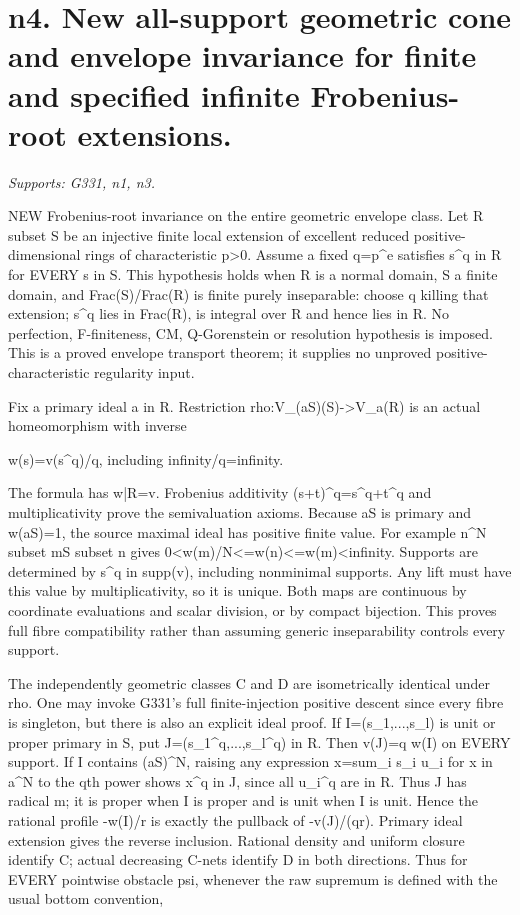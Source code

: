\section{n4. New all-support geometric cone and envelope invariance for finite and specified infinite Frobenius-root extensions.}
\textit{Supports: G331, n1, n3.}

NEW Frobenius-root invariance on the entire geometric envelope class. Let R subset S be an injective finite local extension of excellent reduced positive-dimensional rings of characteristic p\textgreater{}0. Assume a fixed q=p\textasciicircum{}e satisfies s\textasciicircum{}q in R for EVERY s in S. This hypothesis holds when R is a normal domain, S a finite domain, and Frac(S)/Frac(R) is finite purely inseparable: choose q killing that extension; s\textasciicircum{}q lies in Frac(R), is integral over R and hence lies in R. No perfection, F-finiteness, CM, Q-Gorenstein or resolution hypothesis is imposed. This is a proved envelope transport theorem; it supplies no unproved positive-characteristic regularity input.

Fix a primary ideal a in R. Restriction rho:V\_(aS)(S)-\textgreater{}V\_a(R) is an actual homeomorphism with inverse

 w(s)=v(s\textasciicircum{}q)/q, including infinity/q=infinity.

The formula has w|R=v. Frobenius additivity (s+t)\textasciicircum{}q=s\textasciicircum{}q+t\textasciicircum{}q and multiplicativity prove the semivaluation axioms. Because aS is primary and w(aS)=1, the source maximal ideal has positive finite value. For example n\textasciicircum{}N subset mS subset n gives 0\textless{}w(m)/N\textless{}=w(n)\textless{}=w(m)\textless{}infinity. Supports are determined by s\textasciicircum{}q in supp(v), including nonminimal supports. Any lift must have this value by multiplicativity, so it is unique. Both maps are continuous by coordinate evaluations and scalar division, or by compact bijection. This proves full fibre compatibility rather than assuming generic inseparability controls every support.

The independently geometric classes C and D are isometrically identical under rho. One may invoke G331's full finite-injection positive descent since every fibre is singleton, but there is also an explicit ideal proof. If I=(s\_1,...,s\_l) is unit or proper primary in S, put J=(s\_1\textasciicircum{}q,...,s\_l\textasciicircum{}q) in R. Then v(J)=q w(I) on EVERY support. If I contains (aS)\textasciicircum{}N, raising any expression x=sum\_i s\_i u\_i for x in a\textasciicircum{}N to the qth power shows x\textasciicircum{}q in J, since all u\_i\textasciicircum{}q are in R. Thus J has radical m; it is proper when I is proper and is unit when I is unit. Hence the rational profile -w(I)/r is exactly the pullback of -v(J)/(qr). Primary ideal extension gives the reverse inclusion. Rational density and uniform closure identify C; actual decreasing C-nets identify D in both directions. Thus for EVERY pointwise obstacle psi, whenever the raw supremum is defined with the usual bottom convention,


